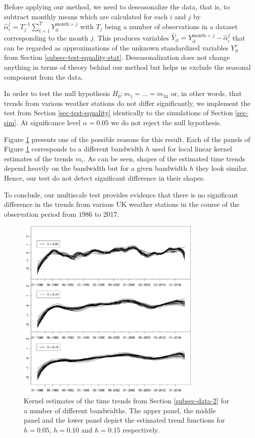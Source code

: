 Before applying our method, we need to deseasonalize the data, that is, to subtract monthly means which are calculated for each $i$ and $j$ by $\widehat{\alpha}^j_i = T_j^{-1} \sum_{t = 1}^T Y_{it}^{\text{month} = j}$ with $T_j$ being a number of observations in a dataset corresponding to the month $j$. This produces variables $\widehat{Y}_{it} =  Y_{it}^{\text{month} = j} - \widehat{\alpha}_i^j$ that can be regarded as approximations of the unknown standardized variables $Y_{it}^o$ from Section \ref{subsec-test-equality-stat}. Deseasonalization does not change anything in terms of theory behind our method but helps us exclude the seasonal component from the data. 


In order to test the null hypothesis $H_0: m_1 = \ldots = m_{34}$ or, in other words, that trends from various weather stations do not differ significantly, we implement the test from Section \ref{sec-test-equality} identically to the simulations of Section \ref{sec-sim}. At significance level $\alpha = 0.05$ we do not reject the null hypothesis.


Figure \ref{plot-results-app2} presents one of the possible reasons for this result. Each of the panels of Figure \ref{plot-results-app2} corresponds to a different bandwidth $h$ used for local linear kernel estimates of the trends $m_i$. As can be seen, shapes of the estimated time trends depend heavily on the bandwidth but for a given bandwidth $h$ they look similar. Hence, our test do not detect significant difference in their shapes. 


To conclude, our multiscale test provides evidence that there is no significant difference in the trends from various UK weather stations in the course of the observation period from $1986$ to $2017$.

\begin{figure}[t]
\centering
\includegraphics[width=0.8\textwidth]{Plots/stations_data.pdf}
\vspace{0.2cm}
\caption{Kernel estimates of the time trends from Section \ref{subsec-data-2} for a number of different bandwidths. The upper panel, the middle panel and the lower panel depict the estimated trend functions for $h = 0.05$, $h = 0.10$ and $h = 0.15$ respectively.}\label{plot-results-app2}
\end{figure}
